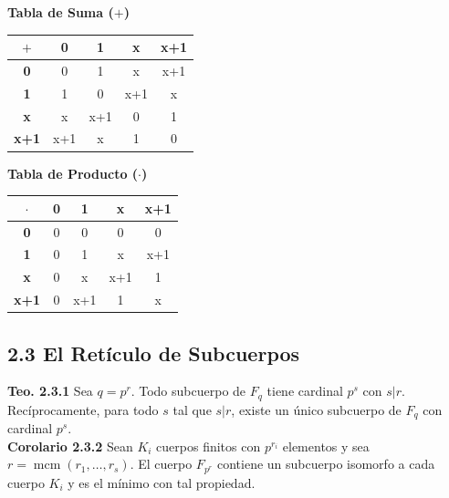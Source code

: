 \documentclass{article}
\begin{document}
\vspace{0.3cm}
\begin{minipage}{0.45\textwidth}
\centering
\textbf{Tabla de Suma ($+$)} \\
\vspace{0.2cm}
\begin{tabular}{|c|c|c|c|c|}
\hline
$\mathbf{+}$ & \textbf{0} & \textbf{1} & \textbf{x} & \textbf{x+1} \\ \hline
\textbf{0}   & 0 & 1 & x & x+1 \\ \hline
\textbf{1}   & 1 & 0 & x+1 & x \\ \hline
\textbf{x}   & x & x+1 & 0 & 1 \\ \hline
\textbf{x+1} & x+1 & x & 1 & 0 \\ \hline
\end{tabular}
\end{minipage}
\hfill
\begin{minipage}{0.45\textwidth}
\centering
\textbf{Tabla de Producto ($\cdot$)} \\
\vspace{0.2cm}
\begin{tabular}{|c|c|c|c|c|}
\hline
$\mathbf{\cdot}$ & \textbf{0} & \textbf{1} & \textbf{x} & \textbf{x+1} \\ \hline
\textbf{0}   & 0 & 0 & 0 & 0 \\ \hline
\textbf{1}   & 0 & 1 & x & x+1 \\ \hline
\textbf{x}   & 0 & x & x+1 & 1 \\ \hline
\textbf{x+1} & 0 & x+1 & 1 & x \\ \hline
\end{tabular}
\end{minipage}
\vspace{0.5cm}

\subsection{2.3 El Retículo de Subcuerpos}

\textbf{Teo. 2.3.1}
Sea $q = p^r$. Todo subcuerpo de $F_q$ tiene cardinal $p^s$ con $s|r$. Recíprocamente, para todo $s$ tal que $s|r$, existe un único subcuerpo de $F_q$ con cardinal $p^s$.\\

\textbf{Corolario 2.3.2}
Sean $K_i$ cuerpos finitos con $p^{r_i}$ elementos y sea $r = \operatorname{mcm}(r_1, \dots, r_s)$. El cuerpo $F_{p^r}$ contiene un subcuerpo isomorfo a cada cuerpo $K_i$ y es el mínimo con tal propiedad.
\end{document}
